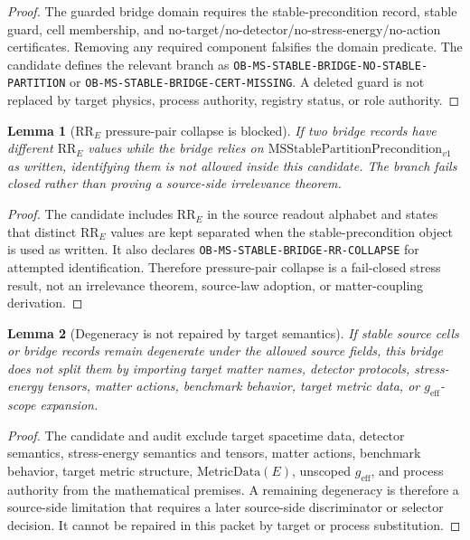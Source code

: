 \documentclass[11pt]{article}
\newcommand{\MSStablePre}{\mathrm{MSStablePartitionPrecondition}_{v1}}
\newcommand{\MetricData}{\mathrm{MetricData}}
\newcommand{\geff}{g_{\mathrm{eff}}}
\newtheorem{lemma}{Lemma}
\begin{document}
\begin{proof}
The guarded bridge domain requires the stable-precondition record, stable
guard, cell membership, and no-target/no-detector/no-stress-energy/no-action
certificates. Removing any required component falsifies the domain predicate.
The candidate defines the relevant branch as
\texttt{OB-MS-STABLE-BRIDGE-NO-STABLE-PARTITION} or
\texttt{OB-MS-STABLE-BRIDGE-CERT-MISSING}. A deleted guard is not replaced by
target physics, process authority, registry status, or role authority.
\end{proof}

\begin{lemma}[\(\mathrm{RR}_E\) pressure-pair collapse is blocked]
If two bridge records have different \(\mathrm{RR}_E\) values while the bridge
relies on \(\MSStablePre\) as written, identifying them is not allowed inside
this candidate. The branch fails closed rather than proving a source-side
irrelevance theorem.
\end{lemma}

\begin{proof}
The candidate includes \(\mathrm{RR}_E\) in the source readout alphabet and
states that distinct \(\mathrm{RR}_E\) values are kept separated when the
stable-precondition object is used as written. It also declares
\texttt{OB-MS-STABLE-BRIDGE-RR-COLLAPSE} for attempted identification.
Therefore pressure-pair collapse is a fail-closed stress result, not an
irrelevance theorem, source-law adoption, or matter-coupling derivation.
\end{proof}

\begin{lemma}[Degeneracy is not repaired by target semantics]
If stable source cells or bridge records remain degenerate under the allowed
source fields, this bridge does not split them by importing target matter
names, detector protocols, stress-energy tensors, matter actions, benchmark
behavior, target metric data, or \(\geff\)-scope expansion.
\end{lemma}

\begin{proof}
The candidate and audit exclude target spacetime data, detector semantics,
stress-energy semantics and tensors, matter actions, benchmark behavior,
target metric structure, \(\MetricData(E)\), unscoped \(\geff\), and process
authority from the mathematical premises. A remaining degeneracy is therefore
a source-side limitation that requires a later source-side discriminator or
selector decision. It cannot be repaired in this packet by target or process
substitution.
\end{proof}
\end{document}
